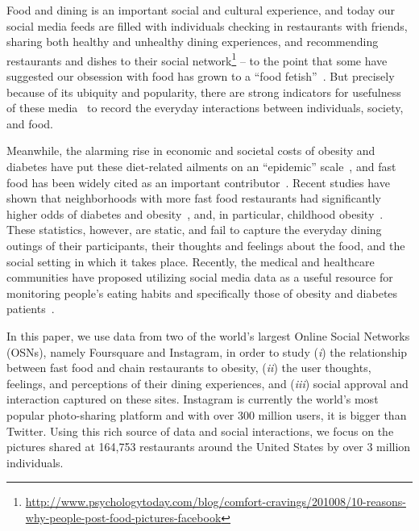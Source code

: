 \documentclass{sig-alternate-2013}
\begin{document}
Food and dining is an important social and cultural experience, and today our social media feeds are filled with individuals checking in restaurants with friends, sharing both healthy and unhealthy dining experiences, and recommending restaurants and dishes to their social network\footnote{\url{http://www.psychologytoday.com/blog/comfort-cravings/201008/10-reasons-why-people-post-food-pictures-facebook}} -- to the point that some have suggested our obsession with food has grown to a ``food fetish''~\cite{FoodFetish}. But precisely because of its ubiquity and popularity, there are strong indicators for usefulness of these media~\cite{abbar2014you,conf/icwsm/PaulD11} to record the everyday interactions between individuals, society, and food.

Meanwhile, the alarming rise in economic and societal costs of obesity and diabetes have put these diet-related ailments on an ``epidemic'' scale~\cite{wang2007obesity}, and fast food has been widely cited as an important contributor~\cite{schlosser2012fast}. Recent studies have shown that neighborhoods with more fast food restaurants had significantly higher odds of diabetes and obesity~\cite{bodicoat2014number}, and, in particular, childhood obesity~\cite{currie2009effect}. These statistics, however, are static, and fail to capture the everyday dining outings of their participants, their thoughts and feelings about the food, and the social setting in which it takes place. Recently, the medical and healthcare communities have proposed utilizing social media data as a useful resource for monitoring people's eating habits and specifically those of obesity and diabetes patients~\cite{InnovativeHealth}. 

In this paper, we use data from two of the world's largest Online Social Networks (OSNs), namely Foursquare and Instagram, in order to study (\emph{i}) the relationship between fast food and chain restaurants to obesity, (\emph{ii}) the user thoughts, feelings, and perceptions of their dining experiences, and (\emph{iii}) social approval and interaction captured on these sites. Instagram is currently the world's most popular photo-sharing platform and with over 300 million users, it is bigger than Twitter. Using this rich source of data and social interactions, we focus on the pictures shared at 164,753 restaurants around the United States by over 3 million individuals. 
\end{document}
